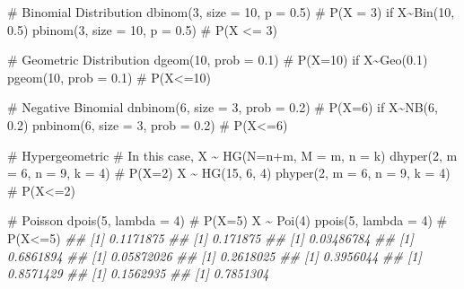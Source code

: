 \documentclass[
  letterpaper,
  DIV=11,
  numbers=noendperiod]{scrreprt}
\newenvironment{Shaded}{\begin{snugshade}}{\end{snugshade}}
\newcommand{\AttributeTok}[1]{\textcolor[rgb]{0.40,0.45,0.13}{#1}}
\newcommand{\CommentTok}[1]{\textcolor[rgb]{0.37,0.37,0.37}{#1}}
\newcommand{\DecValTok}[1]{\textcolor[rgb]{0.68,0.00,0.00}{#1}}
\newcommand{\DocumentationTok}[1]{\textcolor[rgb]{0.37,0.37,0.37}{\textit{#1}}}
\newcommand{\FloatTok}[1]{\textcolor[rgb]{0.68,0.00,0.00}{#1}}
\newcommand{\FunctionTok}[1]{\textcolor[rgb]{0.28,0.35,0.67}{#1}}
\newcommand{\NormalTok}[1]{\textcolor[rgb]{0.00,0.23,0.31}{#1}}
\theoremstyle{definition}
\theoremstyle{definition}
\theoremstyle{definition}
\theoremstyle{remark}
\begin{document}
\begin{Shaded}
\begin{Highlighting}[]
\CommentTok{\# Binomial Distribution}
\FunctionTok{dbinom}\NormalTok{(}\DecValTok{3}\NormalTok{, }\AttributeTok{size =} \DecValTok{10}\NormalTok{, }\AttributeTok{p =} \FloatTok{0.5}\NormalTok{)     }\CommentTok{\# P(X = 3) if X\textasciitilde{}Bin(10, 0.5)}
\FunctionTok{pbinom}\NormalTok{(}\DecValTok{3}\NormalTok{, }\AttributeTok{size =} \DecValTok{10}\NormalTok{, }\AttributeTok{p =} \FloatTok{0.5}\NormalTok{)     }\CommentTok{\# P(X \textless{}= 3)}

\CommentTok{\# Geometric Distribution}
\FunctionTok{dgeom}\NormalTok{(}\DecValTok{10}\NormalTok{, }\AttributeTok{prob =} \FloatTok{0.1}\NormalTok{)             }\CommentTok{\# P(X=10) if X\textasciitilde{}Geo(0.1)}
\FunctionTok{pgeom}\NormalTok{(}\DecValTok{10}\NormalTok{, }\AttributeTok{prob =} \FloatTok{0.1}\NormalTok{)             }\CommentTok{\# P(X\textless{}=10)}

\CommentTok{\# Negative Binomial}
\FunctionTok{dnbinom}\NormalTok{(}\DecValTok{6}\NormalTok{, }\AttributeTok{size =} \DecValTok{3}\NormalTok{, }\AttributeTok{prob =} \FloatTok{0.2}\NormalTok{)  }\CommentTok{\# P(X=6) if X\textasciitilde{}NB(6, 0.2)}
\FunctionTok{pnbinom}\NormalTok{(}\DecValTok{6}\NormalTok{, }\AttributeTok{size =} \DecValTok{3}\NormalTok{, }\AttributeTok{prob =} \FloatTok{0.2}\NormalTok{)  }\CommentTok{\# P(X\textless{}=6)}

\CommentTok{\# Hypergeometric}
\CommentTok{\# In this case, X \textasciitilde{} HG(N=n+m, M = m, n = k)}
\FunctionTok{dhyper}\NormalTok{(}\DecValTok{2}\NormalTok{, }\AttributeTok{m =} \DecValTok{6}\NormalTok{, }\AttributeTok{n =} \DecValTok{9}\NormalTok{, }\AttributeTok{k =} \DecValTok{4}\NormalTok{)    }\CommentTok{\# P(X=2) X \textasciitilde{} HG(15, 6, 4)}
\FunctionTok{phyper}\NormalTok{(}\DecValTok{2}\NormalTok{, }\AttributeTok{m =} \DecValTok{6}\NormalTok{, }\AttributeTok{n =} \DecValTok{9}\NormalTok{, }\AttributeTok{k =} \DecValTok{4}\NormalTok{)    }\CommentTok{\# P(X\textless{}=2)}

\CommentTok{\# Poisson}
\FunctionTok{dpois}\NormalTok{(}\DecValTok{5}\NormalTok{, }\AttributeTok{lambda =} \DecValTok{4}\NormalTok{)              }\CommentTok{\# P(X=5) X \textasciitilde{} Poi(4)}
\FunctionTok{ppois}\NormalTok{(}\DecValTok{5}\NormalTok{, }\AttributeTok{lambda =} \DecValTok{4}\NormalTok{)              }\CommentTok{\# P(X\textless{}=5)}
\DocumentationTok{\#\# [1] 0.1171875}
\DocumentationTok{\#\# [1] 0.171875}
\DocumentationTok{\#\# [1] 0.03486784}
\DocumentationTok{\#\# [1] 0.6861894}
\DocumentationTok{\#\# [1] 0.05872026}
\DocumentationTok{\#\# [1] 0.2618025}
\DocumentationTok{\#\# [1] 0.3956044}
\DocumentationTok{\#\# [1] 0.8571429}
\DocumentationTok{\#\# [1] 0.1562935}
\DocumentationTok{\#\# [1] 0.7851304}
\end{Highlighting}
\end{Shaded}
\end{document}
